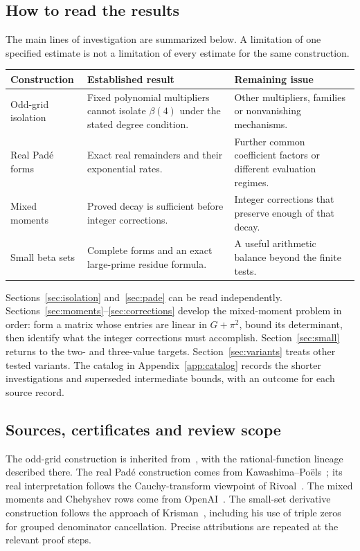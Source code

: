 \subsection{How to read the results}
The main lines of investigation are summarized below. A limitation of
one specified estimate is not a limitation of every estimate for the
same construction.
\begin{center}
\begin{tabular}{@{}>{\raggedright\arraybackslash}p{}>{\raggedright\arraybackslash}p{}>{\raggedright\arraybackslash}p{}@{}}
\toprule
Construction & Established result & Remaining issue \\
\midrule
Odd-grid isolation & Fixed polynomial multipliers cannot isolate
$\beta(4)$ under the stated degree condition. & Other multipliers,
families or nonvanishing mechanisms. \\[3pt]
Real Pad\'e forms & Exact real remainders and their exponential rates. &
Further common coefficient factors or different evaluation regimes. \\[3pt]
Mixed moments & Proved decay is sufficient before integer corrections. &
Integer corrections that preserve enough of that decay. \\[3pt]
Small beta sets & Complete forms and an exact large-prime residue formula. &
A useful arithmetic balance beyond the finite tests. \\
\bottomrule
\end{tabular}
\end{center}

Sections~\ref{sec:isolation} and~\ref{sec:pade} can be read independently.
Sections~\ref{sec:moments}--\ref{sec:corrections} develop the mixed-moment
problem in order: form a matrix whose entries are linear in $G+\pi^2$,
bound its determinant, then identify what the integer corrections
must accomplish.
Section~\ref{sec:small} returns to the two- and three-value targets.
Section~\ref{sec:variants} treats other tested variants. The catalog in
Appendix~\ref{app:catalog} records the shorter investigations and
superseded intermediate bounds, with an outcome for each source record.

\subsection{Sources, certificates and review scope}
The odd-grid construction is inherited from~\cite{shifted}, with the
rational-function lineage described there. The real Pad\'e construction
comes from Kawashima--Po\"els~\cite{KP}; its real interpretation follows
the Cauchy-transform viewpoint of Rivoal~\cite{Rivoal06}. The mixed
moments and Chebyshev rows come from OpenAI~\cite{OpenAI}. The small-set
derivative construction follows the approach of Krisman~\cite{Krisman},
including his use of triple zeros for grouped denominator cancellation.
Precise attributions are repeated at the relevant proof steps.

